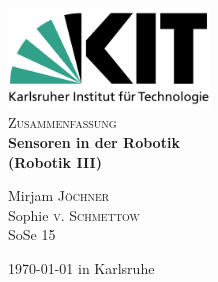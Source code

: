 \documentclass[11pt]{scrartcl}
\begin{document}
\begin{titlepage}

\begin{center}


\includegraphics[width=0.4\textwidth]{Logo_KIT.png}\\[1cm]    



\textsc{\Large Zusammenfassung}\\[0.5cm]


{ \huge \bfseries Sensoren in der Robotik}\\[0.4cm]
{ \large \bfseries (Robotik III)}
\bigskip

Mirjam \textsc{Jöchner}\\
Sophie \textsc{v. Schmettow}\\
SoSe 15\\




\vfill

{\large \today{} in Karlsruhe} 

\end{center}


\end{titlepage}


\tableofcontents
\newpage


\end{document}

